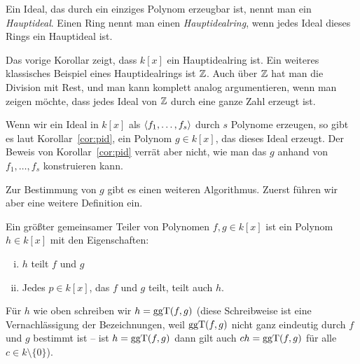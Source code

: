 \documentclass[11pt]{article}
\numberwithin{equation}{section}
\begin{document}
\begin{definition}
Ein Ideal, das durch ein einziges Polynom erzeugbar ist, nennt man ein \emph{Hauptideal}. Einen Ring nennt man einen \emph{Hauptidealring}, wenn jedes Ideal dieses Rings ein Hauptideal ist. 
\end{definition}

Das vorige Korollar zeigt, dass $k[x]$ ein Hauptidealring ist. Ein weiteres klassisches Beispiel eines Hauptidealrings ist $\mathbb{Z}$. Auch über $\mathbb{Z}$ hat man die Division mit Rest, und man kann komplett analog argumentieren, wenn man zeigen möchte, dass jedes Ideal von $\mathbb{Z}$ durch eine ganze Zahl erzeugt ist. 

Wenn wir ein Ideal in $k[x]$ als $\left< f_1,\ldots,f_s \right>$ durch $s$ Polynome erzeugen, so gibt es laut Korollar~\ref{cor:pid}, ein Polynom $g \in k[x]$, das dieses Ideal erzeugt. Der Beweis von Korollar~\ref{cor:pid} verrät aber nicht, wie man das $g$ anhand von $f_1,\ldots,f_s$ konstruieren kann. 

Zur Bestimmung von $g$ gibt es einen weiteren Algorithmus. Zuerst führen wir aber eine weitere Definition ein. 

\begin{definition} 
	Ein größter gemeinsamer Teiler von Polynomen $f,g \in k[x]$ ist ein Polynom $h \in k[x]$ mit den Eigenschaften: 
	\begin{enumerate}[(i)]
		\item $h$ teilt $f$ und $g$ 
		\item Jedes $p \in k[x]$, das $f$ und $g$ teilt, teilt auch $h$. 
	\end{enumerate} 
Für $h$ wie oben schreiben wir $h = \operatorname{ggT}(f,g)$ (diese Schreibweise ist eine Vernachlässigung der Bezeichnungen, weil $\operatorname{ggT}(f,g)$ nicht ganz eindeutig durch $f$ und $g$ bestimmt ist -- ist $h = \operatorname{ggT}(f,g)$ dann gilt auch $c h = \operatorname{ggT}(f,g)$ für alle $c \in k \setminus \{0\}$). 
\end{definition} 
\end{document}
